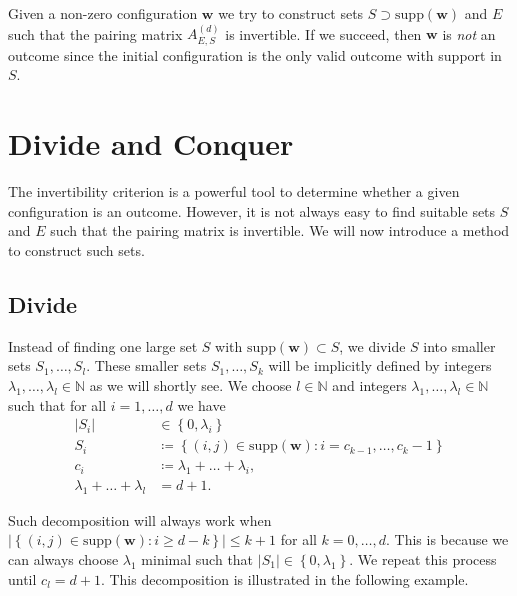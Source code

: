Given a non-zero configuration \( \mathbf{w} \) we try to construct sets \( S \supset \mathrm{supp}(\mathbf w) \) and \( E \) such that the pairing matrix \( A_{E,S}^{(d)} \) is invertible. If we succeed, then \( \mathbf{w} \) is \emph{not} an outcome since the initial configuration is the only valid outcome with support in \( S \). 

\section{Divide and Conquer}\label{sec:divide-and-conquer}

The invertibility criterion is a powerful tool to determine whether a given configuration is an outcome. However, it is not always easy to find suitable sets \( S \) and \( E \) such that the pairing matrix is invertible. We will now introduce a method to construct such sets.

\subsection*{Divide}

Instead of finding one large set \( S \) with \( \mathrm{supp}(\mathbf w) \subset S \), we divide \( S \) into smaller sets \( S_1, \dots, S_l \). These smaller sets \( S_1, \dots, S_k \) will be implicitly defined by integers \( \lambda_1, \dots, \lambda_l \in \mathbb{N} \) as we will shortly see. We choose \( l \in \mathbb{N} \) and integers \( \lambda_1, \dots, \lambda_l \in \mathbb{N} \) such that for all \( i=1, \dots, d \) we have
\begin{align*}
    \lvert S_i \rvert &\in \left\{ 0, \lambda_i \right\} \\
    S_i &\coloneqq \left\{ (i,j) \in \mathrm{supp}(\mathbf w) : i = c_{k-1}, \dots, c_k - 1 \right\} \\
    c_i &\coloneqq \lambda_1 + \dots + \lambda_i, \\
    \lambda_1 + \dots + \lambda_l &= d+1.
\end{align*}

Such decomposition will always work when \( \lvert \left\{ (i,j) \in \mathrm{supp}(\mathbf{w}) : i \geq d-k \right\} \rvert \leq k+1 \) for all \( k = 0, \dots, d \). This is because we can always choose \( \lambda_1  \) minimal such that \( \lvert S_1 \rvert \in \left\{ 0, \lambda_1 \right\} \). We repeat this process until \( c_l = d+1 \). This decomposition is illustrated in the following example.

